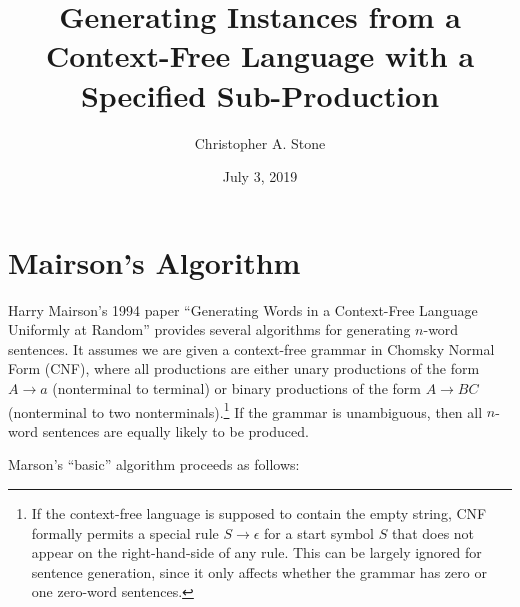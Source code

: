 \documentclass[12pt]{article}
\title{Generating Instances from a Context-Free Language with a Specified Sub-Production}
\author{Christopher A. Stone}
\date{July 3, 2019}
\begin{document}
\maketitle

\section{Mairson's Algorithm}

Harry Mairson's 1994 paper ``Generating Words in a Context-Free Language Uniformly at Random'' provides several algorithms for generating $n$-word sentences. It assumes we are given a context-free grammar in Chomsky Normal Form (CNF), where all productions are either unary productions of the form $A\to a$ (nonterminal to terminal) or binary productions of the form $A\to BC$ (nonterminal to two nonterminals).\footnote{If the context-free language is supposed to contain the empty string, CNF formally permits a special rule $S\to\epsilon$ for a start symbol $S$ that does not appear on the right-hand-side of any rule. This can be largely ignored for sentence generation, since it only affects whether the grammar has zero or one zero-word sentences.}  If the grammar is unambiguous, then all $n$-word sentences are equally likely to be produced.

Marson's ``basic'' algorithm proceeds as follows:
\end{document}
